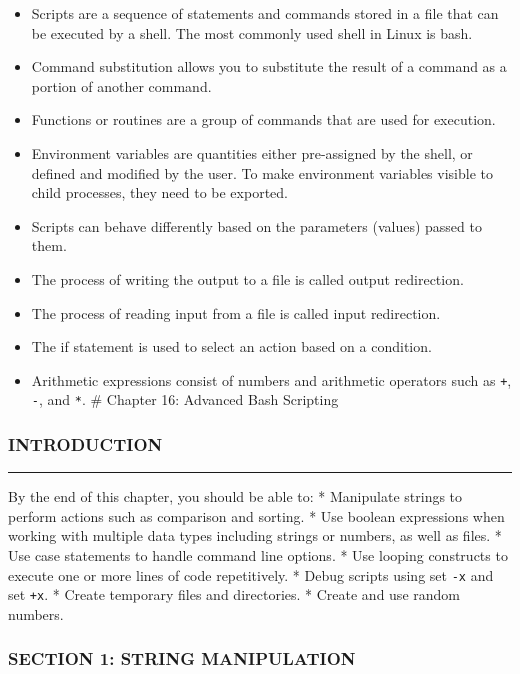 \begin{itemize}
\itemsep1pt\parskip0pt
\item
  Scripts are a sequence of statements and commands stored in a file
  that can be executed by a shell. The most commonly used shell in Linux
  is bash.
\item
  Command substitution allows you to substitute the result of a command
  as a portion of another command.
\item
  Functions or routines are a group of commands that are used for
  execution.
\item
  Environment variables are quantities either pre-assigned by the shell,
  or defined and modified by the user. To make environment variables
  visible to child processes, they need to be exported.
\item
  Scripts can behave differently based on the parameters (values) passed
  to them.
\item
  The process of writing the output to a file is called output
  redirection.
\item
  The process of reading input from a file is called input redirection.
\item
  The if statement is used to select an action based on a condition.
\item
  Arithmetic expressions consist of numbers and arithmetic operators
  such as \texttt{+}, \texttt{-}, and \texttt{*}. \# Chapter 16:
  Advanced Bash Scripting
\end{itemize}

\subsubsection{INTRODUCTION}\label{introduction-15}

\begin{center}\rule{3in}{0.4pt}\end{center}

By the end of this chapter, you should be able to: * Manipulate strings
to perform actions such as comparison and sorting. * Use boolean
expressions when working with multiple data types including strings or
numbers, as well as files. * Use case statements to handle command line
options. * Use looping constructs to execute one or more lines of code
repetitively. * Debug scripts using set \texttt{-x} and set \texttt{+x}.
* Create temporary files and directories. * Create and use random
numbers.

\subsubsection{SECTION 1: STRING
MANIPULATION}\label{section-1-string-manipulation}

